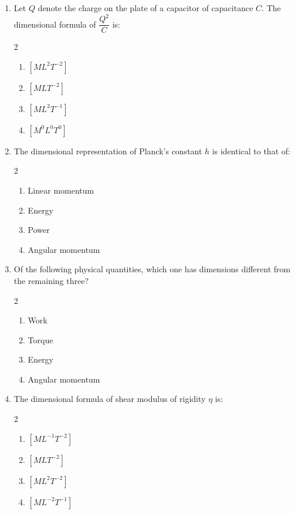 \documentclass[11pt,a4paper]{article}
\begin{document}
\begin{enumerate}[label=\textbf{\textcolor{l1Green}{Q\arabic*.}},leftmargin=24pt,itemsep=10pt]
  \item Let $Q$ denote the charge on the plate of a capacitor of capacitance $C$. The dimensional formula of $\dfrac{Q^2}{C}$ is:
  \begin{multicols}{2}
  \begin{enumerate}[label=\textbf{\textcolor{primaryDark}{(\Alph*)}},itemsep=2pt]
    \item $[M L^2 T^{-2}]$
    \item $[M L T^{-2}]$
    \item $[M L^2 T^{-1}]$
    \item $[M^0 L^0 T^0]$
  \end{enumerate}
  \end{multicols}

  \item The dimensional representation of Planck's constant $h$ is identical to that of:
  \begin{multicols}{2}
  \begin{enumerate}[label=\textbf{\textcolor{primaryDark}{(\Alph*)}},itemsep=2pt]
    \item Linear momentum
    \item Energy
    \item Power
    \item Angular momentum
  \end{enumerate}
  \end{multicols}

  \item Of the following physical quantities, which one has dimensions different from the remaining three?
  \begin{multicols}{2}
  \begin{enumerate}[label=\textbf{\textcolor{primaryDark}{(\Alph*)}},itemsep=2pt]
    \item Work
    \item Torque
    \item Energy
    \item Angular momentum
  \end{enumerate}
  \end{multicols}

  \item The dimensional formula of shear modulus of rigidity $\eta$ is:
  \begin{multicols}{2}
  \begin{enumerate}[label=\textbf{\textcolor{primaryDark}{(\Alph*)}},itemsep=2pt]
    \item $[M L^{-1} T^{-2}]$
    \item $[M L T^{-2}]$
    \item $[M L^2 T^{-2}]$
    \item $[M L^{-2} T^{-1}]$
  \end{enumerate}
  \end{multicols}


\end{enumerate}
\end{document}
